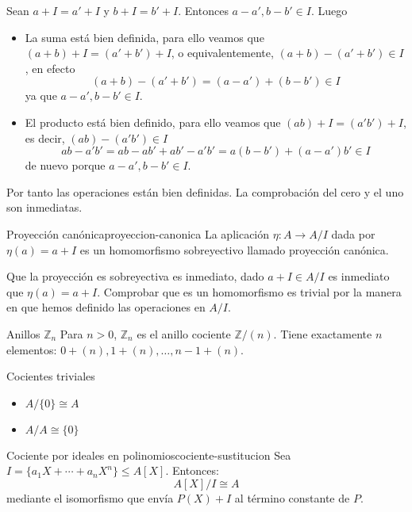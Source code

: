 \begin{proofbox}
    Sean \(a + I = a' + I\) y \(b + I = b' + I\). Entonces \(a - a', b - b' \in I\). Luego
    \begin{itemize}
        \item La suma está bien definida, para ello veamos que $(a+b) + I = (a' + b') + I$, o equivalentemente, $(a + b) - (a' + b') \in I$, en efecto
        \[
        (a + b) - (a' + b') = (a - a') + (b - b') \in I
        \]
        ya que $a - a', b - b' \in I$.
        \item El producto está bien definido, para ello veamos que $(ab) + I = (a'b') + I$, es decir, $(ab) - (a'b') \in I$
        \[
        ab - a'b' = ab - ab' + ab' - a'b' = a(b - b') + (a - a')b' \in I
        \]
        de nuevo porque $a - a', b - b' \in I$.
    \end{itemize}
    Por tanto las operaciones están bien definidas. La comprobación del cero y el uno son inmediatas.
\end{proofbox}

\begin{definition}{Proyección canónica}{proyeccion-canonica}
    La aplicación \(\eta: A \to A/I\) dada por \(\eta(a) = a + I\) es un homomorfismo sobreyectivo llamado {proyección canónica}.
\end{definition}

\begin{proofbox}
    Que la proyección es sobreyectiva es inmediato, dado $a + I \in A/I$ es inmediato que $\eta(a) = a + I$. Comprobar que es un homomorfismo es trivial por la manera en que hemos definido las operaciones en $A/I$.
\end{proofbox}

\begin{example}{Anillos \(\mathbb{Z}_n\)}{}
    Para \(n > 0\), \(\mathbb{Z}_n\)  es el anillo cociente \(\mathbb{Z}/(n)\). Tiene exactamente \(n\) elementos: \(0 + (n), 1 + (n), \ldots, n-1 + (n)\).
\end{example}

\begin{example}{Cocientes triviales}{}
    \begin{itemize}
        \item \(A/\{0\} \cong A\)
        \item \(A/A \cong \{0\}\)
    \end{itemize}
\end{example}

\begin{example}{Cociente por ideales en polinomios}{cociente-sustitucion}
    Sea \(I = \{a_1X + \cdots + a_nX^n\} \leq A[X]\). Entonces:
    \[
    A[X]/I \cong A
    \]
    mediante el isomorfismo que envía \(P(X) + I\) al término constante de \(P\).
\end{example}


